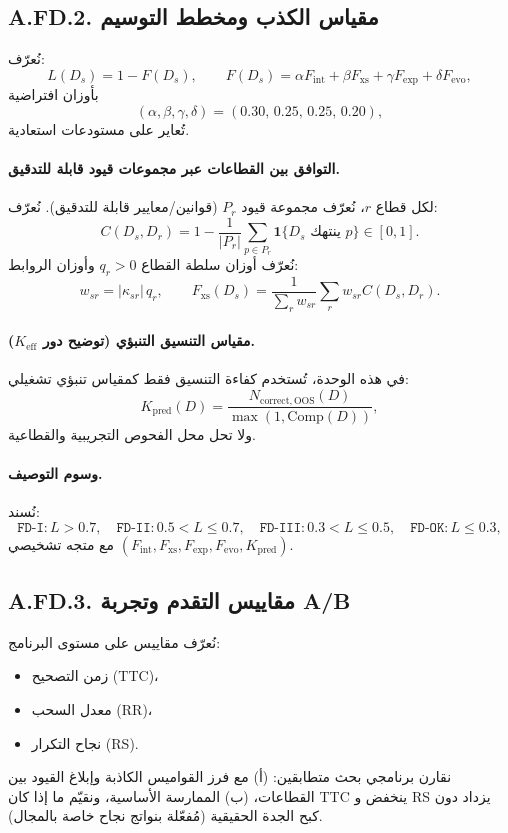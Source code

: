 \documentclass[13pt,a4paper]{article}
\newcommand{\Keff}{K_{\mathrm{eff}}}
\newcommand{\Kpred}{K_{\mathrm{pred}}}
\newcommand{\abs}[1]{\left|#1\right|}
\newcommand{\indicator}{\mathbf{1}}
\begin{document}
	\subsection*{A.FD.2. مقياس الكذب ومخطط التوسيم}
	نُعرّف:
	\[
	L(D_s)=1-F(D_s),\qquad
	F(D_s)=\alpha F_{\mathrm{int}}+\beta F_{\mathrm{xs}}+\gamma F_{\mathrm{exp}}+\delta F_{\mathrm{evo}},
	\]
	بأوزان افتراضية
	\[
	(\alpha,\beta,\gamma,\delta)=(0.30,\,0.25,\,0.25,\,0.20),
	\]
	تُعاير على مستودعات استعادية.
	
	\paragraph{التوافق بين القطاعات عبر مجموعات قيود قابلة للتدقيق.}
	لكل قطاع $r$، نُعرّف مجموعة قيود $P_r$ (قوانين/معايير قابلة للتدقيق). نُعرّف:
	\[
	C(D_s,D_r)=1-\frac{1}{|P_r|}\sum_{p\in P_r}\indicator\{D_s\text{ ينتهك }p\}\in[0,1].
	\]
	نُعرّف أوزان سلطة القطاع $q_r>0$ وأوزان الروابط:
	\[
	w_{sr}=\abs{\kappa_{sr}}\,q_r,\qquad
	F_{\mathrm{xs}}(D_s)=\frac{1}{\sum_r w_{sr}}\sum_{r}w_{sr}C(D_s,D_r).
	\]
	
	\paragraph{مقياس التنسيق التنبؤي (توضيح دور $\Keff$).}
	في هذه الوحدة، تُستخدم كفاءة التنسيق فقط كمقياس تنبؤي تشغيلي:
	\[
	\Kpred(D)=\frac{N_{\mathrm{correct,OOS}}(D)}{\max(1,\mathrm{Comp}(D))},
	\]
	ولا تحل محل الفحوص التجريبية والقطاعية.
	
	\paragraph{وسوم التوصيف.}
	نُسند:
	\[
	\texttt{FD-I}: L>0.7,\quad
	\texttt{FD-II}: 0.5<L\le0.7,\quad
	\texttt{FD-III}: 0.3<L\le0.5,\quad
	\texttt{FD-OK}: L\le0.3,
	\]
	مع متجه تشخيصي $(F_{\mathrm{int}},F_{\mathrm{xs}},F_{\mathrm{exp}},F_{\mathrm{evo}},\Kpred)$.
	
	\subsection*{A.FD.3. مقاييس التقدم وتجربة A/B}
	نُعرّف مقاييس على مستوى البرنامج:
	\begin{itemize}[leftmargin=*]
		\item زمن التصحيح (TTC)،
		\item معدل السحب (RR)،
		\item نجاح التكرار (RS).
	\end{itemize}
	نقارن برنامجي بحث متطابقين: (أ) مع فرز القواميس الكاذبة وإبلاغ القيود بين القطاعات، (ب) الممارسة الأساسية، ونقيّم ما إذا كان TTC ينخفض و RS يزداد دون كبح الجدة الحقيقية (مُفعّلة بنواتج نجاح خاصة بالمجال).
	
\end{document}
